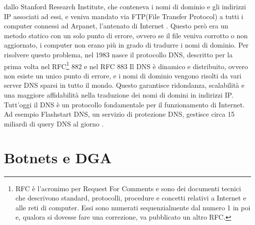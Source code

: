 \documentclass[12pt,a4paper,openright,twoside]{book}
\begin{document}
dallo Stanford Research Institute, che conteneva i nomi di dominio e gli indirizzi IP associati ad essi,
e veniva mandato via FTP(File Transfer Protocol) a tutti i computer connessi ad Arpanet, l'antenato di Internet \cite{dnshistory}.
Questo però era un metodo statico con un solo punto di errore,
ovvero se il file veniva corrotto o non aggiornato, i computer non erano più in grado di tradurre i nomi di dominio.
Per risolvere questo problema, nel 1983 nasce il protocollo DNS,
descritto per la prima volta nel RFC\footnote{RFC è l'acronimo per Request For Comments
e sono dei documenti tecnici che descrivono standard, protocolli, procedure e concetti relativi a Internet e alle reti di computer.
Essi sono numerati sequenzialmente dal numero 1 in poi e, qualora si dovesse fare una correzione, va pubblicato un altro RFC\cite{rfcmeaning}.}
882 \cite{rfc882} e nel RFC 883 \cite{rfc883}
Il DNS è dinamico e distribuito, ovvero non esiste un unico punto di errore,
e i nomi di dominio vengono risolti da vari server DNS sparsi in tutto il mondo.
Questo garantisce ridondanza, scalabilità e una maggiore affidabilità
nella traduzione dei nomi di domini in indirizzi IP.
Tutt'oggi il DNS è un protocollo fondamentale per il funzionamento di Internet.
Ad esempio Flashstart DNS, un servizio di protezione DNS, gestisce 
circa 15 miliardi di query DNS al giorno \cite{flashstartdns}.
\raggedbottom

\section{Botnets e DGA}
\end{document}
